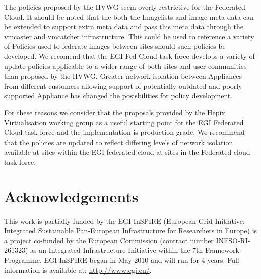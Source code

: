 \documentclass{llncs_Ibergrid2013}
\begin{document}
The policies proposed by the HVWG seem overly restrictive for the Federated Cloud. It should be noted that the both the Imagelists and image meta data can be extended to support extra meta data and pass this meta data through the vmcaster and vmcatcher infrastructure. This could be used to reference a variety of Policies used to federate images between sites should such policies be developed. We recomend that the EGI Fed Cloud task force develops a variety of update policies applicable to a wider range of both sites and user communities than proposed by the HVWG. Greater network isolation between Appliances from different customers allowing support of potentially outdated and poorly supported Appliance has changed the posisbilities for policy development.

For these reasons we consider that the proposals provided by the Hepix Virtualisation working group as a useful starting point for the EGI Federated Cloud task force and the implementation is production grade. We recommend that the policies are updated to reflect differing levels of network isolation available at sites within the EGI federated cloud at sites in the Federated cloud task force.

\section*{Acknowledgements}
\label{sect-acknowledgements}
This work is partially funded by the  EGI-InSPIRE (European Grid Initiative: Integrated Sustainable
Pan-European Infrastructure for Researchers in Europe) is a project co-funded by the European Commission 
(contract number INFSO-RI-261323) as an Integrated Infrastructure Initiative within the 7th Framework 
Programme. EGI-InSPIRE began in May 2010 and will run for 4 years. Full information is available at:
\url{http://www.egi.eu/}.

%
%
%


%




\end{document}
